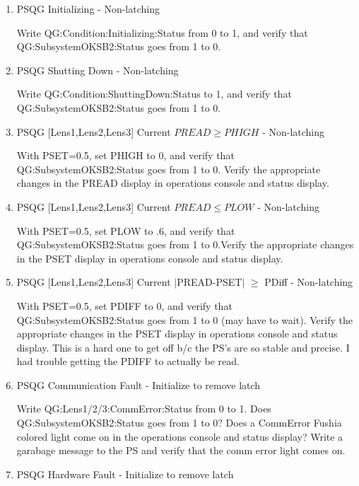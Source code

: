 \documentclass[11pt]{book}		%
\begin{document}
\begin{enumerate}
 \item PSQG Initializing - Non-latching

\color{red}
Write QG:Condition:Initializing:Status from 0 to 1, and verify that QG:SubsystemOKSB2:Status goes from 1 to 0.
\color{black}

 \item PSQG Shutting Down - Non-latching

\color{red}
Write QG:Condition:ShuttingDown:Status to 1, and verify that QG:SubsystemOKSB2:Status goes from 1 to 0.
\color{black}


 \item PSQG [Lens1,Lens2,Lens3] Current $PREAD \geq PHIGH$ - Non-latching

\color{red}
With PSET=0.5, set PHIGH to 0, and verify that QG:SubsystemOKSB2:Status goes from 1 to 0. Verify the appropriate changes in the PREAD display in operations console and status display.
\color{black}

 \item PSQG [Lens1,Lens2,Lens3] Current $PREAD \leq PLOW$ - Non-latching

\color{red}
With PSET=0.5, set PLOW to .6, and verify that QG:SubsystemOKSB2:Status goes from 1 to 0.Verify the appropriate changes in the PSET display in operations console and status display.
\color{black}

 \item PSQG [Lens1,Lens2,Lens3] Current $\mid$PREAD-PSET$\mid$  $\geq$ PDiff - Non-latching

\color{red}
With PSET=0.5, set PDIFF to 0, and verify that QG:SubsystemOKSB2:Status goes from 1 to 0 (may have to wait). Verify the appropriate changes in the PSET display in operations console and status display. This is a hard one to get off b/c the PS's are so stable and precise. I had trouble getting the PDIFF to actually be read.
\color{black}

 \item PSQG Communication Fault - Initialize to remove latch

\color{red}
Write QG:Lens1/2/3:CommError:Status from 0 to 1. Does QG:SubsystemOKSB2:Status goes from 1 to 0? Does a CommError Fushia colored light come on in the operations console and status display? Write a garabage message to the PS and verify that the comm error light comes on.
\color{black}

 \item PSQG Hardware Fault - Initialize to remove latch


\end{enumerate}
\end{document}
